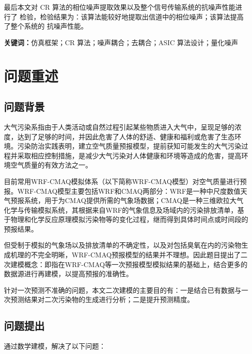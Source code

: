 \documentclass[a4paper,10pt]{my_paper}
\numberwithin{equation}{section}
\begin{document}
最后本文对 CR 算法的相位噪声提取效果以及整个信号传输系统的抗噪声性能进行了
检验，检验结果为：该算法能较好地提取出信道中的相位噪声；该算法提高了整个系统的
抗噪声性能。
                                                                                    
\vspace{1em}
\noindent \textbf{关键词：}仿真框架；CR 算法；噪声耦合；去耦合；ASIC 算法设计；量化噪声



\newpage

\begin{center}
\tableofcontents
\end{center}

\newpage
\section{问题重述}
\subsection{问题背景}

大气污染系指由于人类活动或自然过程引起某些物质进入大气中，呈现足够的浓度，达到了足够的时间，并因此危害了人体的舒适、健康和福利或危害了生态环境\cite{ref1}。污染防治实践表明，建立空气质量预报模型，提前获知可能发生的大气污染过程并采取相应控制措施，是减少大气污染对人体健康和环境等造成的危害，提高环境空气质量的有效方法之一。

目前常用WRF-CMAQ模拟体系（以下简称WRF-CMAQ模型）对空气质量进行预报。WRF-CMAQ模型主要包括WRF和CMAQ两部分：WRF是一种中尺度数值天气预报系统，用于为CMAQ提供所需的气象场数据；CMAQ是一种三维欧拉大气化学与传输模拟系统，其根据来自WRF的气象信息及场域内的污染排放清单，基于物理和化学反应原理模拟污染物等的变化过程，继而得到具体时间点或时间段的预报结果。

但受制于模拟的气象场以及排放清单的不确定性，以及对包括臭氧在内的污染物生成机理的不完全明晰，WRF-CMAQ预报模型的结果并不理想。因此题目提出了二次建模概念：即指在WRF-CMAQ等一次预报模型模拟结果的基础上，结合更多的数据源进行再建模，以提高预报的准确性。

针对一次预测不准确的问题，本文二次建模的主要目的有：一是结合已有数据与一次预测结果对二次污染物的生成进行分析；二是提升预测精度。

\subsection{问题提出}
通过数学建模，解决了以下问题：
\end{document}
